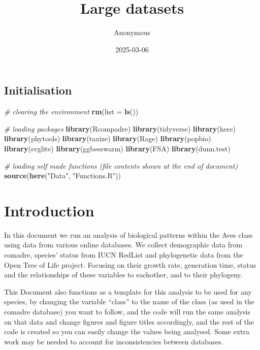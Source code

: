 \documentclass[
]{article}
\title{Large datasets}
\author{Anonymous}
\date{2025-03-06}
\newenvironment{Shaded}{\begin{snugshade}}{\end{snugshade}}
\newcommand{\AttributeTok}[1]{\textcolor[rgb]{0.13,0.29,0.53}{#1}}
\newcommand{\CommentTok}[1]{\textcolor[rgb]{0.56,0.35,0.01}{\textit{#1}}}
\newcommand{\FunctionTok}[1]{\textcolor[rgb]{0.13,0.29,0.53}{\textbf{#1}}}
\newcommand{\NormalTok}[1]{#1}
\newcommand{\StringTok}[1]{\textcolor[rgb]{0.31,0.60,0.02}{#1}}
\begin{document}
\maketitle

\subsection{Initialisation}\label{initialisation}

\begin{Shaded}
\begin{Highlighting}[]
\CommentTok{\# clearing the environment}
\FunctionTok{rm}\NormalTok{(}\AttributeTok{list =} \FunctionTok{ls}\NormalTok{())}

\CommentTok{\# loading packages}
\FunctionTok{library}\NormalTok{(Rcompadre)}
\FunctionTok{library}\NormalTok{(tidyverse)}
\FunctionTok{library}\NormalTok{(here)}
\FunctionTok{library}\NormalTok{(phytools)}
\FunctionTok{library}\NormalTok{(taxize)}
\FunctionTok{library}\NormalTok{(Rage)}
\FunctionTok{library}\NormalTok{(popbio)}
\FunctionTok{library}\NormalTok{(svglite)}
\FunctionTok{library}\NormalTok{(ggbeeswarm)}
\FunctionTok{library}\NormalTok{(FSA)}
\FunctionTok{library}\NormalTok{(dunn.test)}

\CommentTok{\# loading self made functions (file contents shown at the end of document)}
\FunctionTok{source}\NormalTok{(}\FunctionTok{here}\NormalTok{(}\StringTok{"Data"}\NormalTok{, }\StringTok{"Functions.R"}\NormalTok{))}
\end{Highlighting}
\end{Shaded}

\section{Introduction}\label{introduction}

In this document we run an analysis of biological patterns within the
Aves class using data from various online databases. We collect
demographic data from comadre, species' status from IUCN RedList and
phylogenetic data from the Open Tree of Life project. Focusing on their
growth rate, generation time, status and the relationships of these
variables to eachother, and to their phylogeny.

This Document also functions as a template for this analysis to be used
for any species, by changing the variable ``class'' to the name of the
class (as used in the comadre database) you want to follow, and the code
will run the same analysis on that data and change figures and figure
titles accordingly, and the rest of the code is created so you can
easily change the values being analysed. Some extra work may be needed
to account for inconsistencies between databases.
\end{document}
